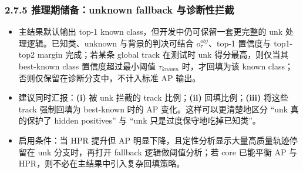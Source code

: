 \documentclass[UTF8]{ctexart}
\begin{document}
\subsubsection*{2.7.5 推理期储备：unknown fallback 与诊断性拦截}
\begin{itemize}
\item 主结果默认输出 top-1 known class，但开发中仍可保留一套更完整的 unk 处理逻辑。已知类、unknown 与背景的判决可结合 $o_\tau^{obj}$、top-1 置信度与 top1-top2 margin 完成；若某条 global track 在测试时 unk 得分最高，则仅当其 best-known class 置信度超过最小阈值 $\tau_{known}$ 时，才回填为该 known class；否则仅保留在诊断分支中，不计入标准 AP 输出。
\item 建议同时汇报：\textbf{(i)} 被 unk 拦截的 track 比例；\textbf{(ii)} 回填比例；\textbf{(iii)} 将这些 track 强制回填为 best-known 时的 AP 变化。这样可以更清楚地区分 ``unk 真的保护了 hidden positives'' 与 ``unk 只是过度保守地吃掉已知类''。
\item 启用条件：当 HPR 提升但 AP 明显下降，且定性分析显示大量高质量轨迹停留在 unk 分支时，再打开 fallback 逻辑做阈值分析；若 core 已能平衡 AP 与 HPR，则不必在主结果中引入复杂回填策略。
\end{itemize}
\end{document}
